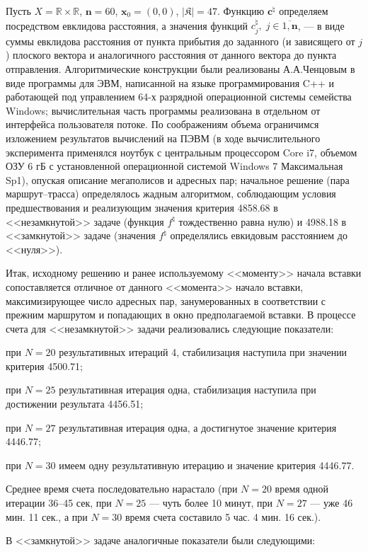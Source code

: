 \documentclass[11pt,twoside,openany]{report}
\begin{document}
{{Пусть $X=\mathbb{R}\times\mathbb{R}$, $\mathbf{n}=60$,
$\mathbf{x}_0=(0,0)$,
$\vert \mathfrak{K} \vert=47$. Функцию $\mathbf{c}^{\natural}$ определяем посредством евклидова расстояния,
а значения функций $c_j^{\natural},\;j \in \overline{1,\mathbf{n}}$, --- в виде суммы евклидова расстояния
от пункта прибытия до заданного (и зависящего от $j$) плоского вектора и аналогичного расстояния от данного
вектора до пункта отправления. Алгоритмические конструкции были реализованы
А.А.Ченцовым в виде программы для ЭВМ, написанной на языке программирования C++
и работающей под управлением 64-х разрядной операционной
системы семейства Windows; вычислительная часть программы реализована в отдельном от интерфейса пользователя потоке.
По соображениям объема ограничимся изложением результатов вычислений на ПЭВМ
(в ходе вычислительного эксперимента применялся ноутбук с центральным процессором Core i7, объемом ОЗУ 6 гБ
с установленной операционной системой Windows 7 Максимальная Sp1), опуская описание мегаполисов и адресных пар;
начальное решение (пара маршрут--трасса) определялось жадным алгоритмом, соблюдающим условия предшествования
и реализующим значения критерия 4858.68 в <<незамкнутой>> задаче (функция $f^{\natural}$ тождественно равна нулю)
и 4988.18 в <<замкнутой>> задаче (значения $f^{\natural}$ определялись евкидовым расстоянием до <<нуля>>).

Итак, исходному решению и ранее используемому <<моменту>> начала
вставки сопоставляется отличное от данного <<момента>> начало вставки, максимизирующее
число адресных пар, занумерованных в соответствии с прежним маршрутом и попадающих в
окно предполагаемой вставки. В процессе счета для <<незамкнутой>> задачи
реализовались следующие показатели:

при $N=20$ результативных итераций 4, стабилизация наступила при значении критерия 4500.71;

при $N=25$ результативная итерация одна, стабилизация наступила при достижении результата 4456.51;

при $N=27$ результативная итерация одна, а достигнутое значение критерия $4446.77$;

при $N=30$ имеем одну результативную итерацию и значение критерия 4446.77.

Среднее время счета последовательно нарастало (при $N=20$ время одной итерации 36--45 сек, при $N=25$ ---
чуть более 10 минут, при $N=27$ --- уже 46 мин. 11 сек., а при $N=30$ время счета составило 5 час. 4 мин. 16 сек.).


В <<замкнутой>> задаче аналогичные показатели были следующими:

}}
\end{document}
